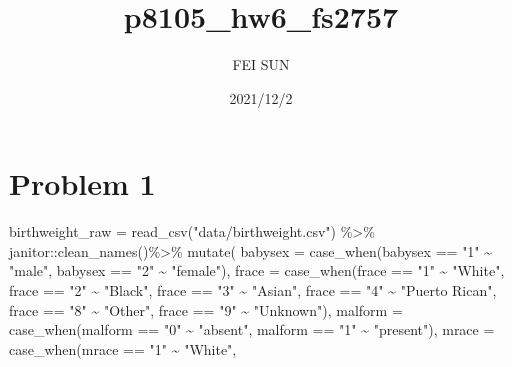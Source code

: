 \documentclass[
]{article}
\title{p8105\_hw6\_fs2757}
\author{FEI SUN}
\date{2021/12/2}
\newenvironment{Shaded}{\begin{snugshade}}{\end{snugshade}}
\newcommand{\AttributeTok}[1]{\textcolor[rgb]{0.77,0.63,0.00}{#1}}
\newcommand{\FunctionTok}[1]{\textcolor[rgb]{0.00,0.00,0.00}{#1}}
\newcommand{\NormalTok}[1]{#1}
\newcommand{\OtherTok}[1]{\textcolor[rgb]{0.56,0.35,0.01}{#1}}
\newcommand{\SpecialCharTok}[1]{\textcolor[rgb]{0.00,0.00,0.00}{#1}}
\newcommand{\StringTok}[1]{\textcolor[rgb]{0.31,0.60,0.02}{#1}}
\begin{document}
\maketitle

\hypertarget{problem-1}{%
\section{Problem 1}\label{problem-1}}

\begin{Shaded}
\begin{Highlighting}[]
\NormalTok{birthweight\_raw }\OtherTok{=} 
  \FunctionTok{read\_csv}\NormalTok{(}\StringTok{"data/birthweight.csv"}\NormalTok{) }\SpecialCharTok{\%\textgreater{}\%} 
\NormalTok{  janitor}\SpecialCharTok{::}\FunctionTok{clean\_names}\NormalTok{()}\SpecialCharTok{\%\textgreater{}\%} 
  \FunctionTok{mutate}\NormalTok{(}
    \AttributeTok{babysex =} \FunctionTok{case\_when}\NormalTok{(babysex }\SpecialCharTok{==} \StringTok{"1"} \SpecialCharTok{\textasciitilde{}} \StringTok{"male"}\NormalTok{,}
\NormalTok{                        babysex }\SpecialCharTok{==} \StringTok{"2"} \SpecialCharTok{\textasciitilde{}} \StringTok{"female"}\NormalTok{),}
    \AttributeTok{frace =} \FunctionTok{case\_when}\NormalTok{(frace }\SpecialCharTok{==} \StringTok{"1"} \SpecialCharTok{\textasciitilde{}} \StringTok{"White"}\NormalTok{,}
\NormalTok{                      frace }\SpecialCharTok{==} \StringTok{"2"} \SpecialCharTok{\textasciitilde{}} \StringTok{"Black"}\NormalTok{,}
\NormalTok{                      frace }\SpecialCharTok{==} \StringTok{"3"} \SpecialCharTok{\textasciitilde{}} \StringTok{"Asian"}\NormalTok{,}
\NormalTok{                      frace }\SpecialCharTok{==} \StringTok{"4"} \SpecialCharTok{\textasciitilde{}} \StringTok{"Puerto Rican"}\NormalTok{, }
\NormalTok{                      frace }\SpecialCharTok{==} \StringTok{"8"} \SpecialCharTok{\textasciitilde{}} \StringTok{"Other"}\NormalTok{,}
\NormalTok{                      frace }\SpecialCharTok{==} \StringTok{"9"} \SpecialCharTok{\textasciitilde{}} \StringTok{"Unknown"}\NormalTok{),}
    \AttributeTok{malform =} \FunctionTok{case\_when}\NormalTok{(malform }\SpecialCharTok{==} \StringTok{"0"} \SpecialCharTok{\textasciitilde{}} \StringTok{"absent"}\NormalTok{,}
\NormalTok{                        malform }\SpecialCharTok{==} \StringTok{"1"} \SpecialCharTok{\textasciitilde{}} \StringTok{"present"}\NormalTok{),}
    \AttributeTok{mrace =} \FunctionTok{case\_when}\NormalTok{(mrace }\SpecialCharTok{==} \StringTok{"1"} \SpecialCharTok{\textasciitilde{}} \StringTok{"White"}\NormalTok{,}

\end{Highlighting}
\end{Shaded}
\end{document}

